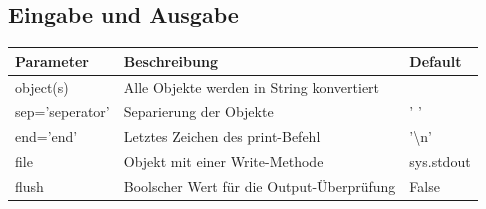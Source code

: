 	\subsection*{Eingabe und Ausgabe}
		\begin{minipage}[h]{7cm}
			
		\end{minipage}
		\begin{minipage}[h]{8cm}
			\begin{tabular}{|l l l|}
				\hline \bfseries{Parameter} & \bfseries{Beschreibung} & \bfseries{Default}
				\\\hline object(s) & Alle Objekte werden in String konvertiert & 
				\\ sep='seperator' & Separierung der Objekte & ' '
				\\ end='end' & Letztes Zeichen des print-Befehl & '\textbackslash n'
				\\ file & Objekt mit einer Write-Methode & sys.stdout
				\\ flush & Boolscher Wert für die Output-Überprüfung & False
				\\\hline
			\end{tabular}
		\end{minipage}